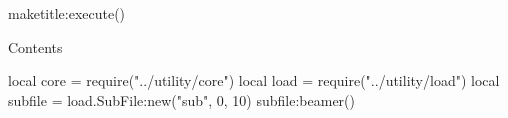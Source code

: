 \documentclass[10pt]{beamer}
\begin{document}
    \begin{luacode*}
        maketitle:execute()
    \end{luacode*}

    \begin{frame}{Contents}
        \tableofcontents
    \end{frame}

    \begin{luacode*}
        local core = require("../utility/core")
        local load = require("../utility/load")
        local subfile = load.SubFile:new("sub", 0, 10)
        subfile:beamer()
    \end{luacode*}

    
    
\end{document}
